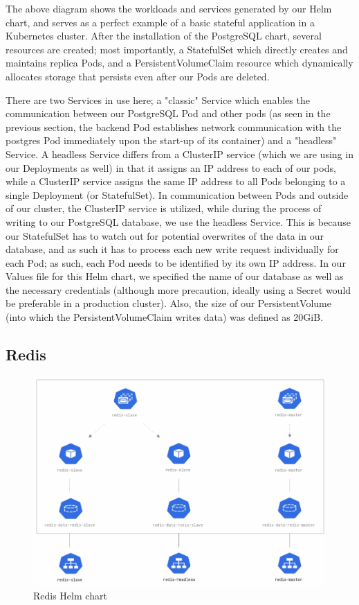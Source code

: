 \documentclass[thesis=B,english]{FITthesis}[2019/12/23]
\begin{document}
The above diagram shows the workloads and services generated by our Helm chart, and serves as a perfect example of a basic stateful application in a Kubernetes cluster. After the installation of the PostgreSQL chart, several resources are created; most importantly, a StatefulSet which directly creates and maintains replica Pods, and a PersistentVolumeClaim resource which dynamically allocates storage that persists even after our Pods are deleted.

There are two Services in use here; a "classic" Service which enables the communication between our PostgreSQL Pod and other pods (as seen in the previous section, the backend Pod establishes network communication with the postgres Pod immediately upon the start-up of its container) and a "headless" Service. A headless Service differs from a ClusterIP service (which we are using in our Deployments as well) in that it assigns an IP address to each of our pods, while a ClusterIP service assigns the same IP address to all Pods belonging to a single Deployment (or StatefulSet). \cite{kube-action} In communication between Pods and outside of our cluster, the ClusterIP service is utilized, while during the process of writing to our PostgreSQL database, we use the headless Service. This is because our StatefulSet has to watch out for potential overwrites of the data in our database, and as such it has to process each new write request individually for each Pod; as such, each Pod needs to be identified by its own IP address. In our Values file for this Helm chart, we specified the name of our database as well as the necessary credentials (although more precaution, ideally using a Secret would be preferable in a production cluster). Also, the size of our PersistentVolume (into which the PersistentVolumeClaim writes data) was defined as 20GiB.

\subsection{Redis}

\begin{figure}[H]
\centering
\caption{Redis Helm chart}
\hspace*{-2.2cm}
\includegraphics[scale=0.5]{redis-diagram}
\end{figure}
\end{document}
